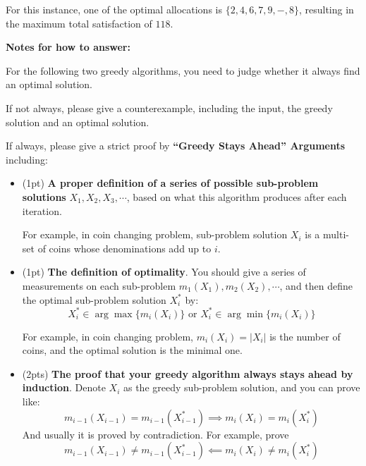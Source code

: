 For this instance, one of the optimal allocations is \( \{2, 4, 6, 7, 9, -, 8\} \), resulting in the maximum total satisfaction of \( 118 \).

\newpage

\textbf{Notes for how to answer:}

For the following two greedy algorithms, you need to judge whether it always find an optimal solution.

If not always, please give a counterexample, including the input, the greedy solution and an optimal solution.

If always, please give a strict proof by \textbf{“Greedy Stays Ahead” Arguments} including:
\begin{itemize}
    \item (1pt) \textbf{A proper definition of a series of possible sub-problem solutions} $X_1, X_2, X_3, \cdots$, based on what this algorithm produces after each iteration.

    For example, in coin changing problem, sub-problem solution $X_i$ is a multi-set of coins whose denominations add up to $i$.
    \item (1pt) \textbf{The definition of optimality}. You should give a series of measurements on each sub-problem $m_1(X_1),m_2(X_2),\cdots$, and then define the optimal sub-problem solution $X_i^*$ by:
    \[X_i^*\in\arg\max\{m_i(X_i)\}\text{ or }X_i^*\in\arg\min\{m_i(X_i)\}\]

    For example, in coin changing problem, $m_i(X_i)=|X_i|$ is the number of coins, and the optimal solution is the minimal one.
    \item (2pts) \textbf{The proof that your greedy algorithm always stays ahead by induction}. Denote $X_i$ as the greedy sub-problem solution, and you can prove like:
    \[m_{i-1}(X_{i-1})=m_{i-1}(X_{i-1}^*)\implies m_i(X_i)=m_i(X_i^*)\]
    And usually it is proved by contradiction. For example, prove
    \[m_{i-1}(X_{i-1})\ne m_{i-1}(X_{i-1}^*)\impliedby m_i(X_i)\ne m_i(X_i^*)\]
\end{itemize}

\newpage

